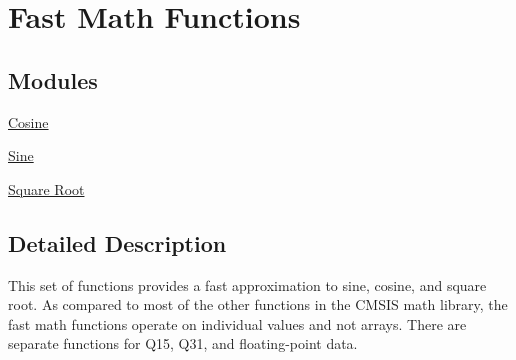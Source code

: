 \hypertarget{group__group_fast_math}{\section{Fast Math Functions}
\label{group__group_fast_math}
}
\subsection*{Modules}
\begin{DoxyCompactItemize}
\item 
\hyperlink{group__cos}{Cosine}
\item 
\hyperlink{group__sin}{Sine}
\item 
\hyperlink{group___s_q_r_t}{Square Root}
\end{DoxyCompactItemize}


\subsection{Detailed Description}
This set of functions provides a fast approximation to sine, cosine, and square root. As compared to most of the other functions in the C\-M\-S\-I\-S math library, the fast math functions operate on individual values and not arrays. There are separate functions for Q15, Q31, and floating-\/point data. 